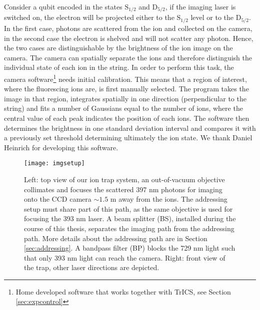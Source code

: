 Consider a qubit encoded in the states $\text{S}_{1/2}$ and $\text{D}_{5/2}$, if the imaging laser is switched on, the electron will be projected either to the $\text{S}_{1/2}$ level or to the $\text{D}_{5/2} $. In the first case, photons are scattered from the ion and collected on the camera, in the second case the electron is shelved and will not scatter any photon. Hence, the two cases are distinguishable by the brightness of the ion image on the camera. The camera can spatially separate the ions and therefore distinguish the individual state of each ion in the string. In order to perform this task, the camera software\footnote{Home developed software that works together with TrICS, see Section \ref{sec:expcontrol}} needs initial calibration. This means that a region of interest, where the fluorescing ions are, is first manually selected. The program takes the image in that region, integrates spatially in one direction (perpendicular to the string) and fits a number of Gaussians equal to the number of ions, where the central value of each peak indicates the position of each ions. The software then determines the brightness in one standard deviation interval and compares it with a previously set threshold determining ultimately the ion state. We thank Daniel Heinrich for developing this software.

\begin{figure}
\centering
\texttt{[image: imgsetup]}
\caption[Caption for LOF]{Left: top view of our ion trap system, an out-of-vacuum objective collimates and focuses the scattered 397 nm photons for imaging onto the CCD camera $\sim 1.5$ m away from the ions. The addressing setup must share part of this path, as the same objective is used for focusing the 393 nm laser.
A beam splitter (BS), installed during the course of this thesis, separates the imaging path from the addressing path. More details about the addressing path are in Section \ref{sec:addressing}.
A bandpass filter (BP) blocks the 729 nm light such that only 393 nm light can reach the camera. Right: front view of the trap, other laser directions are depicted.}
\label{imgsetup}
\end{figure}

